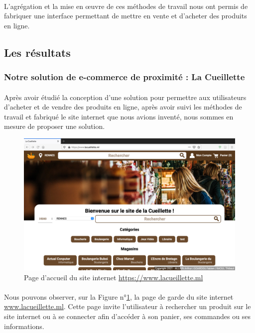 \documentclass[a4paper, 12pt]{article}
\begin{document}
\paragraph{}L’agrégation et la mise en œuvre de ces méthodes de travail nous ont permis de fabriquer une interface permettant de mettre en vente et d’acheter des produits en ligne.

\subsection{Les résultats}
\subsubsection{Notre solution de e-commerce de proximité : La Cueillette}

\paragraph{}Après avoir étudié la conception d’une solution pour permettre aux utilisateurs d’acheter et de vendre des produits en ligne, après avoir suivi les méthodes de travail et fabriqué le site internet que nous avions inventé, nous sommes en mesure de proposer une solution.

\begin{figure}[H]
	\begin{center}
		\includegraphics[width=12cm]{fig/start-page.png}
		\caption{Page d'accueil du site internet \url{https://www.lacueillette.ml}}
		\label{fig:start-page}
	\end{center}
\end{figure}

\paragraph{}Nous pouvons observer, sur la Figure n°\ref{fig:start-page}, la page de garde du site internet \href{https://www.lacueillette.ml}{www.lacueillette.ml}. Cette page invite l’utilisateur à rechercher un produit sur le site internet ou à se connecter afin d’accéder à son panier, ses commandes ou ses informations.
\end{document}
